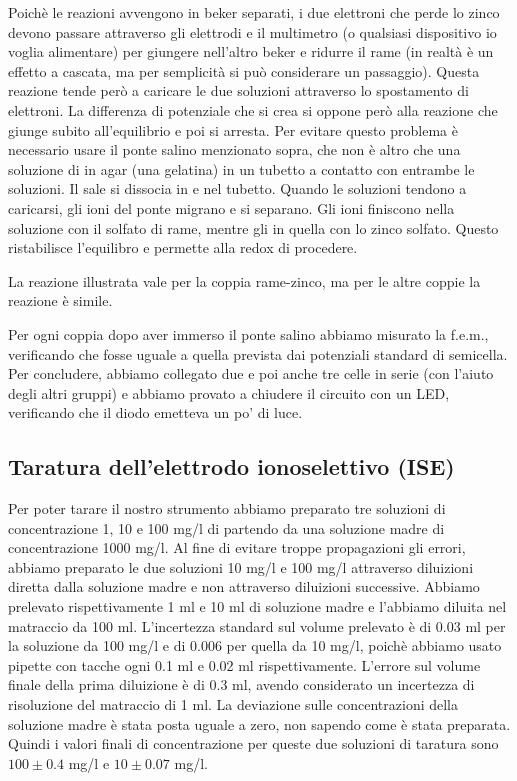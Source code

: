 Poichè le reazioni avvengono in beker separati, i due elettroni che perde lo zinco devono passare
attraverso gli elettrodi e il multimetro (o qualsiasi dispositivo io voglia alimentare)
per giungere nell'altro beker e ridurre il rame
(in realtà è un effetto a cascata, ma per semplicità si può considerare un passaggio). Questa reazione 
tende però a caricare le due soluzioni attraverso lo spostamento di elettroni. La differenza di potenziale che
si crea si oppone però alla reazione che giunge subito all'equilibrio e poi si arresta. Per evitare questo problema
è necessario usare il ponte salino menzionato sopra, che non è altro che una soluzione di  in agar (una gelatina) in un tubetto a contatto con entrambe le soluzioni. Il sale si dissocia in  e  nel tubetto.
Quando le soluzioni tendono a caricarsi, gli ioni del ponte migrano e si separano. Gli ioni  finiscono
nella soluzione con il solfato di rame, mentre gli  in quella con lo zinco solfato. Questo ristabilisce l'equilibro e permette alla redox di procedere.

La reazione illustrata vale per la coppia rame-zinco, ma per le altre coppie la reazione è simile. 

Per ogni coppia dopo aver immerso il ponte salino abbiamo misurato la f.e.m., verificando che fosse
uguale a quella prevista dai potenziali standard di semicella. Per concludere, abbiamo collegato due e poi anche tre
celle in serie (con l'aiuto degli altri gruppi) e abbiamo provato a chiudere il circuito con un LED, verificando
che il diodo emetteva un po' di luce. 

\subsection*{Taratura dell'elettrodo ionoselettivo (ISE)}

Per poter tarare il nostro strumento abbiamo preparato tre soluzioni di concentrazione 1, 10 e 100 mg/l
di  partendo da una soluzione madre di concentrazione 1000 mg/l. 
Al fine di evitare troppe propagazioni gli errori, abbiamo preparato le due soluzioni 10 mg/l e 100 mg/l
attraverso diluizioni diretta dalla soluzione madre e non attraverso diluizioni successive.
Abbiamo prelevato rispettivamente 1 ml e 10 ml di soluzione madre e l'abbiamo diluita nel matraccio da 100 ml.
L'incertezza standard sul volume prelevato è di 0.03 ml per la soluzione da 100 mg/l e di 0.006 per quella da 10 mg/l,
poichè abbiamo usato pipette con tacche ogni 0.1 ml e 0.02 ml rispettivamente.
L'errore sul volume finale della prima diluizione è di 0.3 ml,
avendo considerato un incertezza di risoluzione del matraccio di 1 ml.
La deviazione sulle concentrazioni della soluzione madre è stata posta uguale a zero, non sapendo come è
stata preparata. Quindi i valori finali di concentrazione per queste due soluzioni di taratura sono
$100 \pm 0.4$ mg/l e $10 \pm 0.07$ mg/l.


